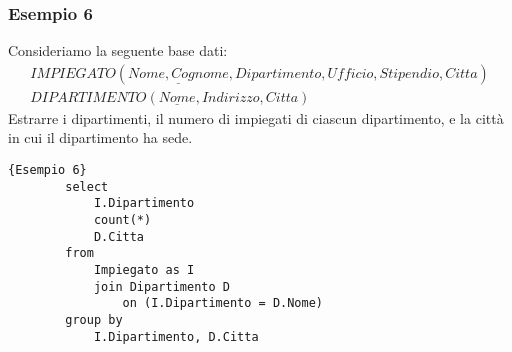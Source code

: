\subsubsection{Esempio 6}
Consideriamo la seguente base dati:
	\begin{equation}\begin{aligned}
		IMPIEGATO (\underline{Nome, Cognome}, Dipartimento, Ufficio, Stipendio, Citta)\\
		DIPARTIMENTO (\underline{Nome}, Indirizzo, Citta)
	\end{aligned}\end{equation}
Estrarre i dipartimenti, il numero di impiegati di ciascun dipartimento, e la città in cui il dipartimento ha sede.
	\begin{lstlisting}{Esempio 6}
		select 
			I.Dipartimento
			count(*)
			D.Citta
		from 
			Impiegato as I
			join Dipartimento D
				on (I.Dipartimento = D.Nome)
		group by
			I.Dipartimento, D.Citta
	\end{lstlisting}
	

